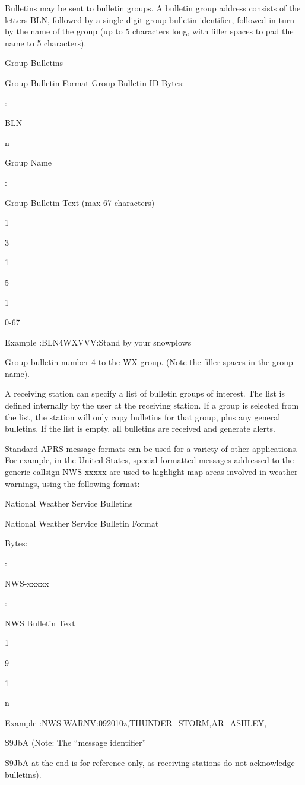 {{{{Bulletins may be sent to bulletin groups. A bulletin group address consists of
the letters BLN, followed by a single-digit group bulletin identifier, followed
in turn by the name of the group (up to 5 characters long, with filler spaces to
pad the name to 5 characters).

Group Bulletins

Group Bulletin Format
Group Bulletin
ID
Bytes:

:

BLN

n

Group
Name

:

Group Bulletin Text
(max 67 characters)

1

3

1

5

1

0-67

Example
:BLN4WXVVV:Stand by your snowplows

Group bulletin number 4 to the WX group.
(Note the filler spaces in the group name).

A receiving station can specify a list of bulletin groups of interest. The list is
defined internally by the user at the receiving station. If a group is selected
from the list, the station will only copy bulletins for that group, plus any
general bulletins. If the list is empty, all bulletins are received and generate
alerts.

Standard APRS message formats can be used for a variety of other
applications. For example, in the United States, special formatted messages
addressed to the generic callsign NWS-xxxxx are used to highlight map areas
involved in weather warnings, using the following format:

National Weather
Service Bulletins

National Weather Service Bulletin Format

Bytes:

:

NWS-xxxxx

:

NWS Bulletin Text

1

9

1

n

Example
:NWS-WARNV:092010z,THUNDER_STORM,AR_ASHLEY,{S9JbA
(Note: The “message identifier” {S9JbA at the end is for reference
only, as receiving stations do not acknowledge bulletins).


}}}}}}
